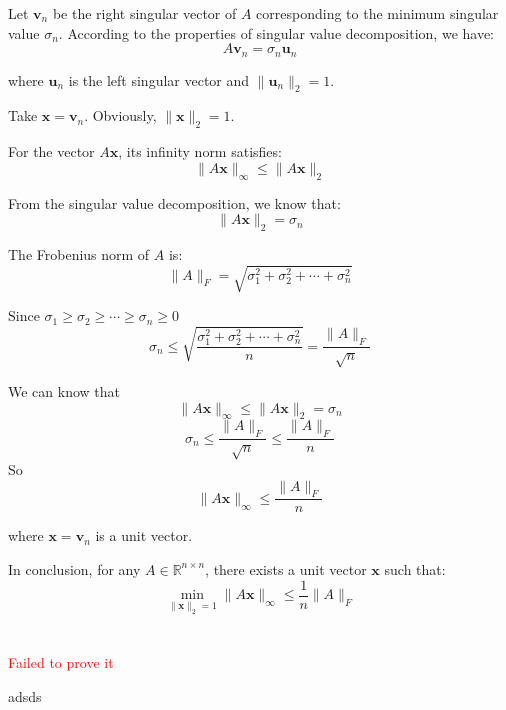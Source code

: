 \documentclass{article}
\begin{document}
Let $ \mathbf{v}_n $ be the right singular vector of $ A $ corresponding to the minimum singular value $ \sigma_n $. According to the properties of singular value decomposition, we have:
$$
A\mathbf{v}_n = \sigma_n \mathbf{u}_n
$$

where $ \mathbf{u}_n $ is the left singular vector and $ \|\mathbf{u}_n\|_2 = 1 $.

Take $ \mathbf{x} = \mathbf{v}_n $. Obviously, $ \|\mathbf{x}\|_2 = 1 $.

For the vector $ A\mathbf{x} $, its infinity norm satisfies:
$$
\|A\mathbf{x}\|_\infty \leq \|A\mathbf{x}\|_2
$$

From the singular value decomposition, we know that:
$$
\|A\mathbf{x}\|_2 = \sigma_n
$$
  
The Frobenius norm of $ A $ is:
$$
\|A\|_F = \sqrt{\sigma_1^2 + \sigma_2^2 + \cdots + \sigma_n^2}
$$

Since $ \sigma_1 \geq \sigma_2 \geq \cdots \geq \sigma_n \geq 0 $
$$
\sigma_n \leq \sqrt{\frac{\sigma_1^2 + \sigma_2^2 + \cdots + \sigma_n^2}{n}} = \frac{\|A\|_F}{\sqrt{n}}
$$

We can know that
$$
\|A\mathbf{x}\|_\infty \leq \|A\mathbf{x}\|_2 = \sigma_n
$$
$$
\sigma_n \leq \frac{\|A\|_F}{\sqrt{n}} \leq \frac{\|A\|_F}{n}
$$
So
$$
\|A\mathbf{x}\|_\infty \leq \frac{\|A\|_F}{n}
$$

where $ \mathbf{x} = \mathbf{v}_n $ is a unit vector.

In conclusion, for any $ A \in \mathbb{R}^{n \times n} $, there exists a unit vector $ \mathbf{x} $ such that:
$$
\min_{\|\mathbf{x}\|_2 = 1} \|A\mathbf{x}\|_\infty \leq \frac{1}{n}\|A\|_F
$$

\section{}

\textcolor{red}{Failed to prove it}


adsds 
\end{document}
